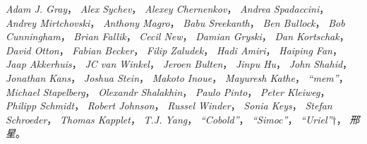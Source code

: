 \emph{Adam J. Gray}，
\emph{Alex Sychev}，
\emph{Alexey Chernenkov}，
\emph{Andrea Spadaccini}，
\emph{Andrey Mirtchovski}，
\emph{Anthony Magro}，
\emph{Babu Sreekanth}，
\emph{Ben Bullock}，
\emph{Bob Cunningham}，
\emph{Brian Fallik}，
\emph{Cecil New}，
\emph{Damian Gryski}，
\emph{Dan Kortschak}，
\emph{David Otton}，
\emph{Fabian Becker}，
\emph{Filip Zaludek}，
\emph{Hadi Amiri}，
\emph{Haiping Fan}，
\emph{Jaap Akkerhuis}，
\emph{JC van Winkel}，
\emph{Jeroen Bulten}，
\emph{Jinpu Hu}，
\emph{John Shahid}，
\emph{Jonathan Kans}，
\emph{Joshua Stein}，
\emph{Makoto Inoue}，
\emph{Mayuresh Kathe}，
\emph{``mem''}，
\emph{Michael Stapelberg}，
\emph{Olexandr Shalakhin}，
\emph{Paulo Pinto}，
\emph{Peter Kleiweg}，
\emph{Philipp Schmidt}，
\emph{Robert Johnson}，
\emph{Russel Winder}，
\emph{Sonia Keys}，
\emph{Stefan Schroeder}，
\emph{Thomas Kapplet}，
\emph{T.J. Yang}，
\emph{``Cobold''}，
\emph{``Simoc''}，
\emph{``Uriel''}$\dagger$，
\emph{邢星}。
